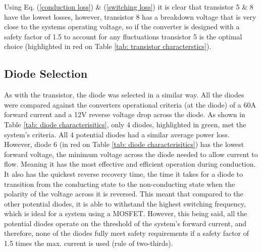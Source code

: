         Using Eq. (\ref{conduction loss}) \& (\ref{switching loss}) it is clear that transistor 5 \& 8 have the lowest losses, however, transistor 8 has a breakdown voltage that is very close to the systems operating voltage, so if the converter is designed with a safety factor of 1.5 to account for any fluctuations transistor 5 is the optimal choice (highlighted in red on Table \ref{tab: transistor characterstics}).

    \subsection{Diode Selection}
        As with the transistor, the diode was selected in a similar way. All the diodes were compared against the converters operational criteria (at the diode) of a 60A forward current and a 12V reverse voltage drop across the diode. As shown in Table \ref{tab: diode characterisitics}, only 4 diodes, highlighted in green, met the system's criteria. All 4 potential diodes had a similar average power loss. However, diode 6 (in red on Table \ref{tab: diode characterisitics}) has the lowest forward voltage, the minimum voltage across the diode needed to allow current to flow. Meaning it has the most effective and efficient operation during conduction. It also has the quickest reverse recovery time, the time it takes for a diode to transition from the conducting state to the non-conducting state when the polarity of the voltage across it is reversed. This meant that compared to the other potential diodes, it is able to withstand the highest switching frequency, which is ideal for a system using a MOSFET. However, this being said, all the potential diodes operate on the threshold of the system's forward current, and therefore, none of the diodes fully meet safety requirements if a safety factor of 1.5 times the max. current is used (rule of two-thirds).
        

